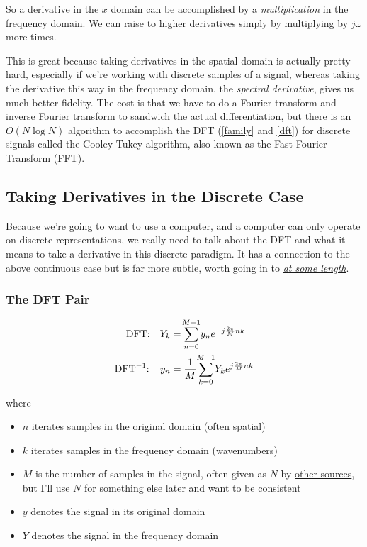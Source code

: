 \documentclass[10pt]{article}
\begin{document}
\noindent So a derivative in the $x$ domain can be accomplished by a \textit{multiplication} in the frequency domain. We can raise to higher derivatives simply by multiplying by $j \omega$ more times.

This is great because taking derivatives in the spatial domain is actually pretty hard, especially if we're working with discrete samples of a signal, whereas taking the derivative this way in the frequency domain, the \textit{spectral derivative}, gives us much better fidelity.\cite{trefethen4, kutz} The cost is that we have to do a Fourier transform and inverse Fourier transform to sandwich the actual differentiation, but there is an $O(N \log N)$ algorithm to accomplish the DFT (\autoref{family} and \autoref{dft}) for discrete signals called the Cooley-Tukey algorithm, also known as the Fast Fourier Transform (FFT)\cite{kutz}.

\subsection{Taking Derivatives in the Discrete Case}

Because we're going to want to use a computer, and a computer can only operate on discrete representations, we really need to talk about the DFT and what it means to take a derivative in this discrete paradigm. It has a connection to the above continuous case but is far more subtle, worth going in to \textit{\href{https://www.youtube.com/watch?v=v7l3Q11DBq0&t=1299s}{at some length}}.

\subsubsection{The DFT Pair}

\begin{equation}\label{dft}
\begin{aligned}
\text{DFT: \ \ } Y_k &= \sum_{n=0}^{\mathclap{M-1}} y_n e^{-j \frac{2\pi}{M} n k} \\
\text{DFT}^{-1} \text{: \ \ } y_n &= \frac{1}{M} \sum_{k=0}^{\mathclap{M-1}} Y_k e^{j \frac{2\pi}{M} n k}
\end{aligned}
\end{equation}

where
\begin{itemize}[noitemsep, topsep=0pt, after=\newline]
	\item $n$ iterates samples in the original domain (often spatial)
	\item $k$ iterates samples in the frequency domain (wavenumbers)
	\item $M$ is the number of samples in the signal, often given as $N$ by \href{https://numpy.org/doc/2.1/reference/routines.fft.html}{other sources}\cite{numpy}, but I'll use $N$ for something else later and want to be consistent
	\item $y$ denotes the signal in its original domain
	\item $Y$ denotes the signal in the frequency domain
\end{itemize}
\end{document}
